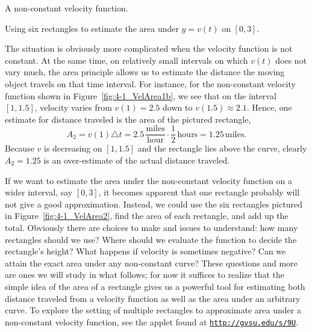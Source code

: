 \begin{marginfigure}[.5cm] %
\caption{A non-constant velocity function.} \label{fig:4-1_VelArea1b}
\end{marginfigure}

\begin{marginfigure}[.5cm] %
\caption{Using six rectangles to estimate the area under $y = v(t)$ on $[0,3]$.} \label{fig:4-1_VelArea2}
\end{marginfigure}	

The situation is obviously more complicated when the velocity function is not constant.  At the same time, on relatively small intervals on which $v(t)$ does not vary much, the area principle allows us to estimate the distance the moving object travels on that time interval.  For instance, for the non-constant velocity function shown in Figure~\ref{fig:4-1_VelArea1b}, we see that on the interval $[1,1.5]$, velocity varies from $v(1) = 2.5$ down to $v(1.5) \approx 2.1$.  Hence, one estimate for distance traveled is the area of the pictured rectangle, 
\[A_2 = v(1) \triangle t = 2.5 \, \frac{\mbox{miles}}{\mbox{hour}} \cdot \frac{1}{2} \, \mbox{hours} = 1.25 \, \mbox{miles}.\]
Because $v$ is decreasing on $[1,1.5]$ and the rectangle lies above the curve, clearly $A_2 = 1.25$ is an over-estimate of the actual distance traveled.

If we want to estimate the area under the non-constant velocity function on a wider interval, say $[0,3]$, it becomes apparent that one rectangle probably will not give a good approximation.  Instead, we could use the six rectangles pictured in Figure~\ref{fig:4-1_VelArea2},  find the area of each rectangle, and add up the total.  Obviously there are choices to make and issues to understand: how many rectangles should we use?  Where should we evaluate the function to decide the rectangle's height?  What happens if velocity is sometimes negative?  Can we attain the exact area under any non-constant curve?  These questions and more are ones we will study in what follows; for now it suffices to realize that the simple idea of the area of a rectangle gives us a powerful tool for estimating both distance traveled from a velocity function as well as the area under an arbitrary curve.  To explore the setting of multiple rectangles to approximate area under a non-constant velocity function, see the applet found at \href{http://gvsu.edu/s/9U}{\texttt{http://gvsu.edu/s/9U}}.

